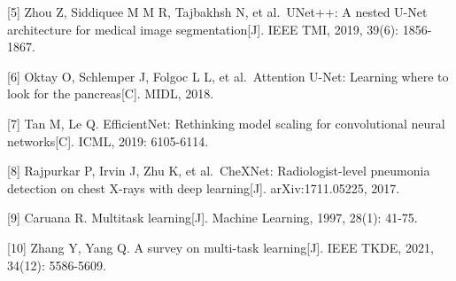 \documentclass{harryopo-mathnotes}
\begin{document}
{[}5{]} Zhou Z, Siddiquee M M R, Tajbakhsh N, et al.~UNet++: A nested
U-Net architecture for medical image segmentation{[}J{]}. IEEE TMI,
2019, 39(6): 1856-1867.

{[}6{]} Oktay O, Schlemper J, Folgoc L L, et al.~Attention U-Net:
Learning where to look for the pancreas{[}C{]}. MIDL, 2018.

{[}7{]} Tan M, Le Q. EfficientNet: Rethinking model scaling for
convolutional neural networks{[}C{]}. ICML, 2019: 6105-6114.

{[}8{]} Rajpurkar P, Irvin J, Zhu K, et al.~CheXNet: Radiologist-level
pneumonia detection on chest X-rays with deep learning{[}J{]}.
arXiv:1711.05225, 2017.

{[}9{]} Caruana R. Multitask learning{[}J{]}. Machine Learning, 1997,
28(1): 41-75.

{[}10{]} Zhang Y, Yang Q. A survey on multi-task learning{[}J{]}. IEEE
TKDE, 2021, 34(12): 5586-5609.
\end{document}
